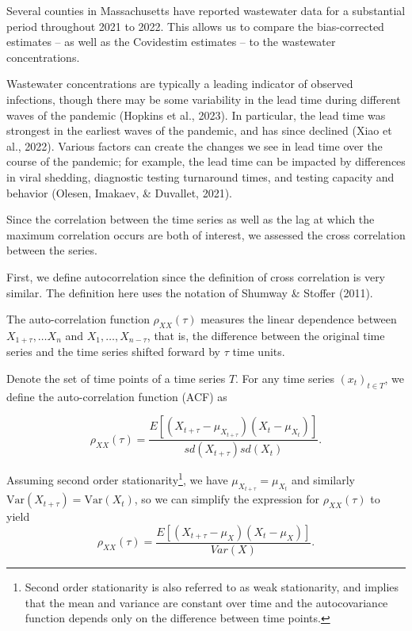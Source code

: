 \documentclass[12pt,twoside]{smiththesis}
\begin{document}
Several counties in Massachusetts have reported wastewater data for a substantial period throughout 2021 to 2022. This allows us to compare the bias-corrected estimates -- as well as the Covidestim estimates -- to the wastewater concentrations.

Wastewater concentrations are typically a leading indicator of observed infections, though there may be some variability in the lead time during different waves of the pandemic (Hopkins et al., 2023). In particular, the lead time was strongest in the earliest waves of the pandemic, and has since declined (Xiao et al., 2022). Various factors can create the changes we see in lead time over the course of the pandemic; for example, the lead time can be impacted by differences in viral shedding, diagnostic testing turnaround times, and testing capacity and behavior (Olesen, Imakaev, \& Duvallet, 2021).

Since the correlation between the time series as well as the lag at which the maximum correlation occurs are both of interest, we assessed the cross correlation between the series.

First, we define autocorrelation since the definition of cross correlation is very similar. The definition here uses the notation of Shumway \& Stoffer (2011).

The auto-correlation function \(\rho_{XX}(\tau)\) measures the linear dependence between \(X_{1+\tau}, \dots X_n\) and \(X_1, \dots, X_{n-\tau}\), that is, the difference between the original time series and the time series shifted forward by \(\tau\) time units.
\begin{tcolorbox}[title=Definition: Autocorrelation]

Denote the set of time points of a time series $T$. For any time series $(x_t)_{t\in T}$, we define the auto-correlation function (ACF)  as 

$$\rho_{XX}(\tau) = \dfrac{E[(X_{t + \tau} - \mu_{X_{t+\tau}}) (X_t - \mu_{X_t})]}{sd(X_{t+\tau}) sd(X_t)}.$$
\end{tcolorbox}
Assuming second order stationarity\footnote{Second order stationarity is also referred to as weak stationarity, and implies that the mean and variance are constant over time and the autocovariance function depends only on the difference between time points.}, we have \(\mu_{X_{t+\tau}}=\mu_{X_{t}}\)
and similarly \(\text{Var}({X_{t+\tau}})=\text{Var}({X_{t}})\), so we can simplify the expression for \(\rho_{XX} (\tau)\) to yield\\
\[\rho_{XX} (\tau)=\dfrac{E[(X_{t + \tau} - \mu_{X}) (X_t - \mu_{X})]}{Var(X)}.\]
\end{document}
